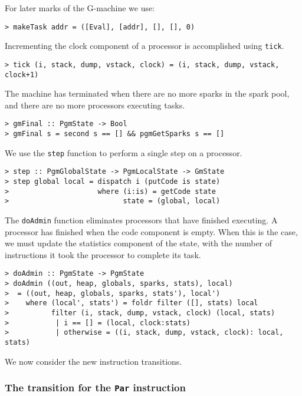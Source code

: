 %
%
For later marks of the G-machine we use:
\begin{verbatim}
> makeTask addr = ([Eval], [addr], [], [], 0)
\end{verbatim}
%
Incrementing the clock component of a processor is accomplished using
\mbox{\tt tick}.
\begin{verbatim}
> tick (i, stack, dump, vstack, clock) = (i, stack, dump, vstack, clock+1)
\end{verbatim}
%
\par
The machine has terminated when there are no more sparks in the spark pool,
and there are no more processors executing tasks.

\begin{verbatim}
> gmFinal :: PgmState -> Bool
> gmFinal s = second s == [] && pgmGetSparks s == []
\end{verbatim}
%
%
We use the \mbox{\tt step} function to perform a single step on a processor.
\begin{verbatim}
> step :: PgmGlobalState -> PgmLocalState -> GmState
> step global local = dispatch i (putCode is state)
>                     where (i:is) = getCode state
>                           state = (global, local)
\end{verbatim}
%
%
\par
The \mbox{\tt doAdmin} function eliminates processors that have finished
executing.  A processor has finished when the code component is empty.
When this is the case, we must update the statistics component of the
state, with the number of instructions it took the processor to
complete its task.
\begin{verbatim}
> doAdmin :: PgmState -> PgmState
> doAdmin ((out, heap, globals, sparks, stats), local)
>  = ((out, heap, globals, sparks, stats'), local')
>    where (local', stats') = foldr filter ([], stats) local
>          filter (i, stack, dump, vstack, clock) (local, stats)
>           | i == [] = (local, clock:stats)
>           | otherwise = ((i, stack, dump, vstack, clock): local, stats)
\end{verbatim}
%
%
We now consider the new instruction transitions.

\subsubsection{The transition for the \mbox{\tt Par} instruction}

